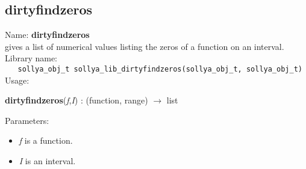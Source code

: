 \subsection{dirtyfindzeros}
\label{labdirtyfindzeros}
\noindent Name: \textbf{dirtyfindzeros}\\
\phantom{aaa}gives a list of numerical values listing the zeros of a function on an interval.\\[0.2cm]
\noindent Library name:\\
\verb|   sollya_obj_t sollya_lib_dirtyfindzeros(sollya_obj_t, sollya_obj_t)|\\[0.2cm]
\noindent Usage: 
\begin{center}
\textbf{dirtyfindzeros}(\emph{f},\emph{I}) : (\textsf{function}, \textsf{range}) $\rightarrow$ \textsf{list}\\
\end{center}
Parameters: 
\begin{itemize}
\item \emph{f} is a function.
\item \emph{I} is an interval.
\end{itemize}

